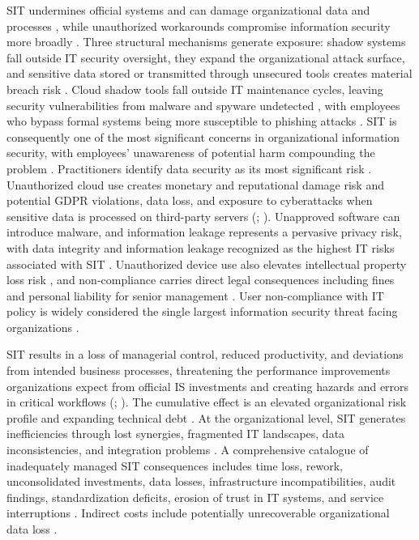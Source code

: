 \documentclass[12pt,oneside]{article}
\begin{document}
\ac{SIT} undermines official systems and can damage organizational data and processes \citep[1025]{silic2017perspective}, while unauthorized workarounds compromise information security more broadly \citep[114]{white2023workarounds}. Three structural mechanisms generate exposure: shadow systems fall outside \ac{IT} security oversight, they expand the organizational attack surface, and sensitive data stored or transmitted through unsecured tools creates material breach risk \citep[1]{nwankpa2024shadow}. Cloud shadow tools fall outside \ac{IT} maintenance cycles, leaving security vulnerabilities from malware and spyware undetected \citep[653]{walterbusch2017missing}, with employees who bypass formal systems being more susceptible to phishing attacks \citep[1]{manga2025cracks}. \ac{SIT} is consequently one of the most significant concerns in organizational information security, with employees' unawareness of potential harm compounding the problem \citep[500]{nguyen2024understanding}. Practitioners identify data security as its most significant risk \citep[10]{kopper2019shadowit}. Unauthorized cloud use creates monetary and reputational damage risk and potential \ac{GDPR} violations, data loss, and exposure to cyberattacks when sensitive data is processed on third-party servers (\citealp[644-645]{walterbusch2017missing}; \citealp[400]{haag2024dealing}). Unapproved software can introduce malware, and information leakage represents a pervasive privacy risk, with data integrity and information leakage recognized as the highest \ac{IT} risks associated with \ac{SIT} \citep[280, 278]{silic2014shadow}. Unauthorized device use also elevates intellectual property loss risk \citep[3]{pirani2014consumerization}, and non-compliance carries direct legal consequences including fines and personal liability for senior management \citep[1]{silvius2012factors}. User non-compliance with \ac{IT} policy is widely considered the single largest information security threat facing organizations \citep[6]{gyoery2012exploring}.

\ac{SIT} results in a loss of managerial control, reduced productivity, and deviations from intended business processes, threatening the performance improvements organizations expect from official IS investments and creating hazards and errors in critical workflows (\citealp[1, 3]{roeder2014managers}; \citealp[4]{shaikh2021shadow}). The cumulative effect is an elevated organizational risk profile and expanding technical debt \citep[115]{white2023workarounds}. At the organizational level, \ac{SIT} generates inefficiencies through lost synergies, fragmented \ac{IT} landscapes, data inconsistencies, and integration problems \citep[3, 8]{kopper2018business}. A comprehensive catalogue of inadequately managed \ac{SIT} consequences includes time loss, rework, unconsolidated investments, data losses, infrastructure incompatibilities, audit findings, standardization deficits, erosion of trust in \ac{IT} systems, and service interruptions \citep[283]{ozkan2021controlling}. Indirect costs include potentially unrecoverable organizational data loss \citep[75]{ogedengbe2024influence}.
\end{document}
